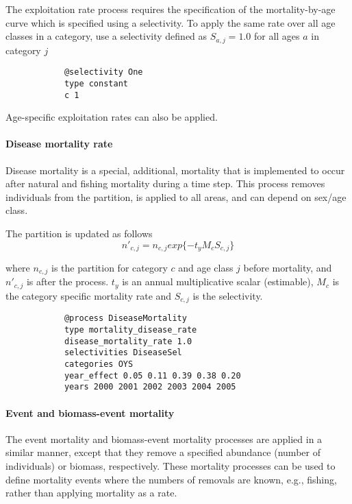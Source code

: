 The exploitation rate process requires the specification of the mortality-by-age curve which is specified using a selectivity. To apply the same rate over all age classes in a category, use a selectivity defined as $S_{a,j}=1.0$ for all ages $a$ in category $j$

{\small{\begin{verbatim}
			@selectivity One
			type constant
			c 1
\end{verbatim}}}

Age-specific exploitation rates can also be applied.

\paragraph{Disease mortality rate}\label{sec:Process-Age-DiseaseMortalityRate}\label{sec:Process-MortalityDiseaseRate}

Disease mortality is a special, additional, mortality that is implemented to occur after natural and fishing mortality during a time step. This process removes individuals from the partition, is applied to all areas, and can depend on sex/age class.

The partition is updated as follows
\begin{equation}
	n'_{c,j} = n_{c,j}  exp\{-t_y M_{c} S_{c,j} \}
\end{equation}

where \(n_{c,j}\) is the partition for category \(c\) and age class \(j\) before mortality, and \(n'_{c,j}\)  is after the process. \(t_y\) is an annual multiplicative scalar (estimable), \(M_{c}\) is the category specific mortality rate and \(S_{c,j}\) is the selectivity.

{\small{\begin{verbatim}
			@process DiseaseMortality
			type mortality_disease_rate
			disease_mortality_rate 1.0
			selectivities DiseaseSel 
			categories OYS
			year_effect 0.05 0.11 0.39 0.38 0.20 
			years 2000 2001 2002 2003 2004 2005 
\end{verbatim}}}

\paragraph{Event and biomass-event mortality}\label{sec:Process-MortalityEvent}\label{sec:Process-MortalityEventBiomass} 


The event mortality and biomass-event mortality processes are applied in a similar manner, except that they remove a specified abundance (number of individuals) or biomass, respectively. These mortality processes can be used to define mortality events where the numbers of removals are known, e.g., fishing, rather than applying mortality as a rate.

